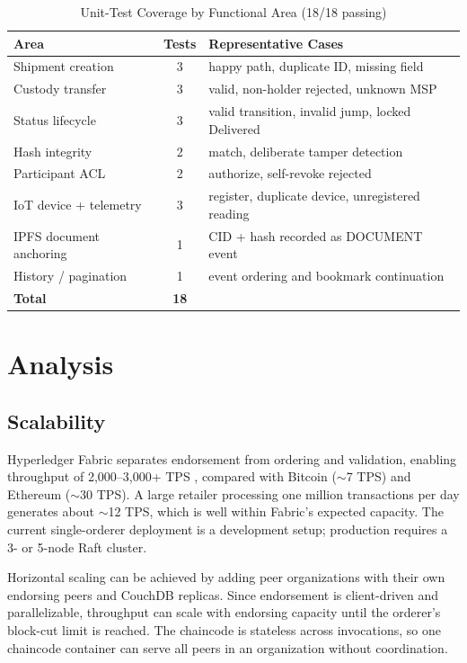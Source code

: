 \documentclass[conference]{IEEEtran}
\begin{document}
\begin{table}[!t]
\caption{Unit-Test Coverage by Functional Area (18/18 passing)}
\label{tab:tests}
\centering
\footnotesize
\renewcommand{\arraystretch}{1.1}
\begin{tabularx}{\columnwidth}{@{}l c X@{}}
\toprule
\textbf{Area} & \textbf{Tests} & \textbf{Representative Cases} \\
\midrule
Shipment creation        & 3 & happy path, duplicate ID, missing field \\
Custody transfer         & 3 & valid, non-holder rejected, unknown MSP \\
Status lifecycle         & 3 & valid transition, invalid jump, locked Delivered \\
Hash integrity           & 2 & match, deliberate tamper detection \\
Participant ACL          & 2 & authorize, self-revoke rejected \\
IoT device + telemetry   & 3 & register, duplicate device, unregistered reading \\
IPFS document anchoring  & 1 & CID + hash recorded as DOCUMENT event \\
History / pagination     & 1 & event ordering and bookmark continuation \\
\midrule
\textbf{Total}           & \textbf{18} & \\
\bottomrule
\end{tabularx}
\end{table}

\section{Analysis}

\subsection{Scalability}

Hyperledger Fabric separates endorsement from ordering and validation,
enabling throughput of 2,000--3,000+ TPS \cite{fabricdocs}, compared with
Bitcoin ($\sim$7 TPS) and Ethereum ($\sim$30 TPS). A large retailer processing
one million transactions per day generates about $\sim$12 TPS, which is well
within Fabric's expected capacity. The current single-orderer deployment is
a development setup; production requires a 3- or 5-node Raft cluster.

Horizontal scaling can be achieved by adding peer organizations with their
own endorsing peers and CouchDB replicas. Since endorsement is client-driven
and parallelizable, throughput can scale with endorsing capacity until the
orderer's block-cut limit is reached. The chaincode is stateless across
invocations, so one chaincode container can serve all peers in an
organization without coordination.
\end{document}
